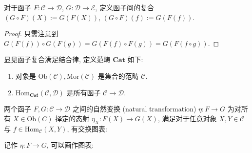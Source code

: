 \begin{definition}
    对于函子 \(F : \mathcal{C} \to \mathcal{D}\), \(G : \mathcal{D} \to \mathcal{E}\), 定义函子间的复合 \((G \circ F) (X) := G(F(X))\), \((G \circ F) (f) := G(F(f))\).

    \begin{proof}
        只需注意到 \(G(F(f)) \circ G(F(g)) = G(F(f) \circ F(g)) = G(F(f \circ g))\).
    \end{proof}
\end{definition}

\begin{definition}
    显见函子复合满足结合律, 定义范畴 \(\mathbf{Cat}\) 如下:

    \begin{enumerate}
        \item 对象是 \(\mathrm{Ob} (\mathcal{C}), \mathrm{Mor} (\mathcal{C})\) 是集合的范畴 \(\mathcal{C}\).
        \item \(\mathrm{Hom}_{\mathbf{Cat}} (\mathcal{C},\mathcal{D})\) 是所有函子 \(\mathcal{C} \to \mathcal{D}\).
    \end{enumerate}
\end{definition}

\begin{definition}[自然变换]
    两个函子 \(F,G : \mathcal{C} \to \mathcal{D}\) 之间的自然变换 (natural transformation) \(\eta : F \to G\) 为对所有 \(X \in \mathrm{Ob} (C)\) 择定的态射 \(\eta_X : F(X) \to G(X)\),
    满足对于任意对象 \(X,Y \in \mathcal{C}\) 与 \(f \in \mathrm{Hom}_{\mathcal{C}} (X,Y)\), 有交换图表:
        
    \begin{center}
    \end{center}

    记作 \(\eta : F \to G\), 可以画作图表:

    \begin{center}
    \end{center}
\end{definition}

